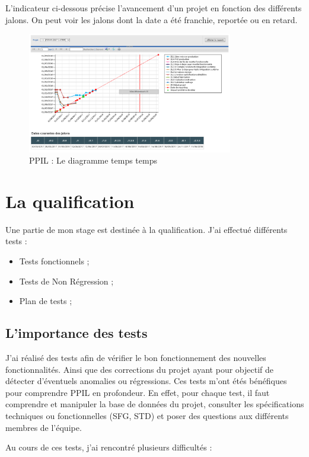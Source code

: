 L'indicateur ci-dessous précise l'avancement d'un projet en fonction des différents jalons. On peut voir les jalons dont la date a été franchie, reportée ou en retard. 

\begin{figure}[H]
\centering
\includegraphics[width=0.8\textwidth]{images/temps-temps.png}
\caption{PPIL : Le diagramme temps temps}
\end{figure}

\section{La qualification}

Une partie de mon stage est destinée à la qualification. J'ai effectué différents tests :
\begin{itemize}
    \item Tests fonctionnels ; 
    \item Tests de Non Régression ;
    \item Plan de tests ;
\end{itemize}

\subsection{L'importance des tests}

J'ai réalisé des tests afin de vérifier le bon fonctionnement des nouvelles fonctionnalités. Ainsi que des corrections du projet ayant pour objectif de détecter d'éventuels anomalies ou régressions. Ces tests m'ont étés bénéfiques pour comprendre PPIL en profondeur. En effet, pour chaque test, il faut comprendre et manipuler la base de données du projet, consulter les spécifications techniques ou fonctionnelles (SFG, STD) et poser des questions aux différents membres de l'équipe.

Au cours de ces tests, j'ai rencontré plusieurs difficultés : 

